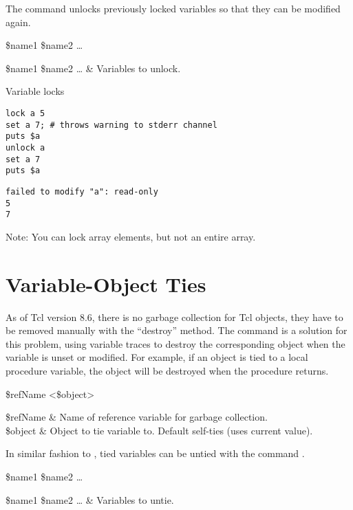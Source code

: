 \documentclass{article}
\begin{document}
The command  unlocks previously locked variables so that they can be modified again.
\begin{syntax}
 \$name1 \$name2 …
\end{syntax}
\begin{args}
\$name1 \$name2 … & Variables to unlock.
\end{args}

\begin{example}{Variable locks}
\begin{lstlisting}
lock a 5
set a 7; # throws warning to stderr channel
puts $a
unlock a
set a 7
puts $a
\end{lstlisting}
\tcblower
\begin{lstlisting}
failed to modify "a": read-only
5
7
\end{lstlisting}
\end{example}

Note: You can lock array elements, but not an entire array.

\clearpage

\section{Variable-Object Ties}
As of Tcl version 8.6, there is no garbage collection for Tcl objects, they have to be removed manually with the ``destroy'' method. 
The command  is a solution for this problem, using variable traces to destroy the corresponding object when the variable is unset or modified. 
For example, if an object is tied to a local procedure variable, the object will be destroyed when the procedure returns.


\begin{syntax}
 \$refName <\$object>
\end{syntax}
\begin{args}
\$refName & Name of reference variable for garbage collection. \\
\$object & Object to tie variable to. Default self-ties (uses current value).
\end{args}

In similar fashion to , tied variables can be untied with the command .
\begin{syntax}
 \$name1 \$name2 …
\end{syntax}
\begin{args}
\$name1 \$name2 … & Variables to untie.
\end{args}
\end{document}
